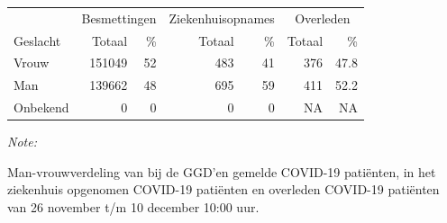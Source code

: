 \documentclass[
  english,
  man,floatsintext]{apa6}
\begin{document}
\newpage

\begin{table}
\centering\begingroup\fontsize{11}{13}\selectfont

\begin{threeparttable}
\begin{tabular}{lrrrrrr}
\toprule
\multicolumn{1}{c}{ } & \multicolumn{2}{c}{Besmettingen} & \multicolumn{2}{c}{Ziekenhuisopnames} & \multicolumn{2}{c}{Overleden} \\
\cmidrule(l{3pt}r{3pt}){2-3} \cmidrule(l{3pt}r{3pt}){4-5} \cmidrule(l{3pt}r{3pt}){6-7}
Geslacht & Totaal & \% & Totaal & \% & Totaal & \%\\
\midrule
Vrouw & 151049 & 52 & 483 & 41 & 376 & 47.8\\
Man & 139662 & 48 & 695 & 59 & 411 & 52.2\\
Onbekend & 0 & 0 & 0 & 0 & NA & NA\\
\bottomrule
\end{tabular}
\begin{tablenotes}
\item \textit{Note: } 
\item Man-vrouwverdeling van bij de GGD’en gemelde COVID-19 patiënten, in het ziekenhuis opgenomen COVID-19 patiënten en overleden COVID-19 patiënten van 26 november t/m 10 december 10:00 uur.
\end{tablenotes}
\end{threeparttable}
\endgroup{}
\end{table}
\newpage
\end{document}

